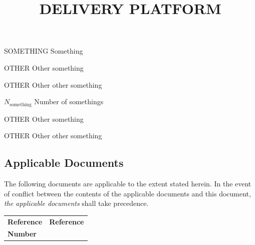 \documentclass[11pt,a4paper]{article}
\title{DELIVERY PLATFORM}
\begin{document}
\sdpfrontpage

\sdptableofcontents

\sdplistofabbreviations
\begin{basedescript}{\desclabelstyle{\pushlabel}\desclabelwidth{6em}}
    \item[SOMETHING] Something \vspace{-0.2cm}
    \item[OTHER] Other something \vspace{-0.2cm}
    \item[OTHER] Other other something \vspace{-0.2cm}
\end{basedescript} 

\sdplistofsymbols
\begin{basedescript}{\desclabelstyle{\pushlabel}\desclabelwidth{6em}}
    \item[$N_\mathrm{something}$] Number of somethings \vspace{-0.2cm}
    \item[OTHER] Other something \vspace{-0.2cm}
    \item[OTHER] Other other something \vspace{-0.2cm}
\end{basedescript} 


\sdplistoffigures

\sdplistoftables

\sdpsummary

\sdpreferencedocs

\subsection*{Applicable Documents}

The following documents are applicable to the extent stated herein. In the
event of conflict between the contents of the applicable documents and this
document, \emph{the applicable documents} shall take precedence.

\begin{center}{
\begin{tabularx}{\textwidth}{|X|X|}
    \hline
    \bf{Reference} & \bf{Reference}\\
    \bf{Number} & \\
    \hline
\end{tabularx}}
\end{center}
\end{document}
